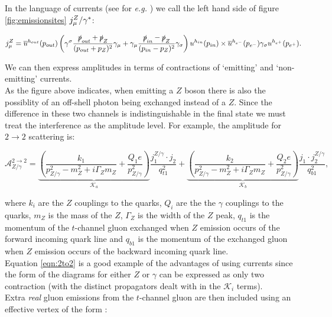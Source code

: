 	In the language of currents (see for \emph{e.g.} \cite{Constructing}) we call
	the left hand side of figure \ref{fig:emissionsites} $j_\mu^Z/\gamma^*$:

	\begin{equation}
		j_\mu^Z = \overline{u}^{h_{out}}(p_{out})\left(\gamma^\sigma\frac{\slashed p_{out} +
			\slashed p_Z}{(p_{out} + p_Z)^2}\gamma_\mu + \gamma_\mu\frac{\slashed p_{in} -
			\slashed p_Z}{(p_{in} - p_Z)^2}\gamma_\sigma\right)u^{h_{in}}(p_{in})\times
			\overline{u}^{h_{e^-}}(p_{e^-})\gamma_\sigma u^{h_{e^+}}(p_{e^+}).
	\end{equation}

	We can then express amplitudes in terms of contractions of `emitting' and `non-emitting'
	currents.\\As the figure above indicates, when emitting a $Z$ boson there is also the
	possiblity of an off-shell photon being exchanged instead of a $Z$.  Since the difference
	in these two channels is indistinguishable in the final state we must treat the
	interference as the amplitude level.  For example, the amplitude for $2\rightarrow 2$ scattering is:

	\begin{equation}
	\mathcal{A}_{Z/\gamma}^{2\rightarrow 2} =\underbrace{\left(\frac{k_1}{p_{Z/\gamma}^2 - m^2_Z +
	i\Gamma_Zm_Z} + \frac{Q_1e}{p_{Z/\gamma}^2}\right)}_{\mathcal{K}_a}\frac{j^{Z/\gamma}_1\cdot
	j_2}{q_{t1}^2} + \underbrace{\left(\frac{k_2}{p_{Z/\gamma}^2 - m^2_Z + i\Gamma_Zm_Z} +
	\frac{Q_2e}{p_{Z/\gamma}^2}\right)}_{\mathcal{K}_b}\frac{j_1\cdot j^{Z/\gamma}_2}{q_{b1}^2},
	\label{eqn:2to2}
	\end{equation}

	where $k_i$ are the $Z$ couplings to the quarks, $Q_i$ are the the $\gamma$ couplings to
	the quarks, $m_Z$ is the mass of the $Z$, $\Gamma_Z$ is the width of the $Z$ peak, $q_{t1}$
	is the momentum of the $t$-channel gluon exchanged when $Z$ emission occurs of the forward
	incoming quark line and $q_{b1}$ is the momentum of the exchanged gluon when $Z$
	emission occurs of the backward incoming quark line.\\Equation \ref{eqn:2to2} is a
	good example of the advantages of using currents since the form of the diagrams for either
	$Z$ or $\gamma$ can be expressed as only two contraction (with the distinct propagators
	dealt with in the $\mathcal{K}_i$ terms).\\Extra \emph{real} gluon emissions from the
	$t$-channel gluon are then included using an effective vertex of the form \cite{JeppeHiggs}\cite{Constructing}:

